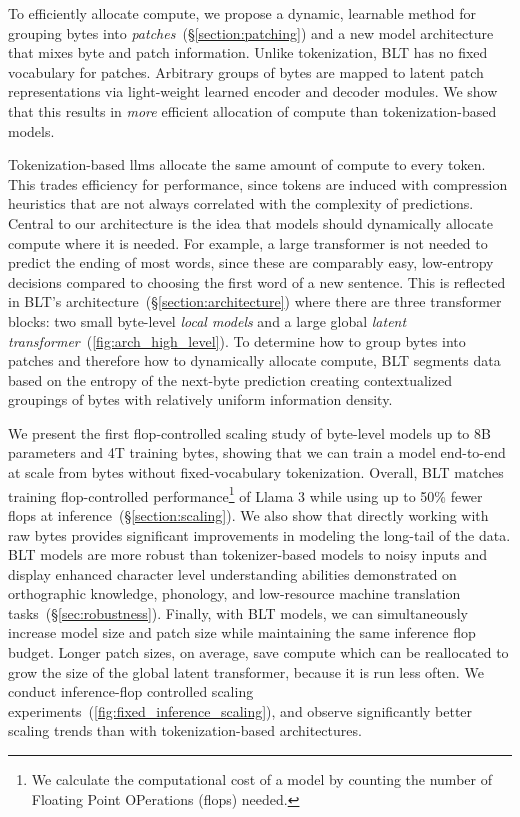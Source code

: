 To efficiently allocate compute, we propose a dynamic, learnable method for grouping bytes into \textit{patches}~(\S\ref{section:patching}) and a new model architecture that mixes byte and patch information. Unlike tokenization, {\textsc BLT} has no fixed vocabulary for patches. Arbitrary groups of bytes are mapped to latent patch representations via light-weight learned encoder and decoder modules. We show that this results in \textit{more} efficient allocation of compute than tokenization-based models.

Tokenization-based llms allocate the same amount of compute to every token. This trades efficiency for performance, since tokens are induced with compression heuristics that are not always correlated with the complexity of predictions. Central to our architecture is the idea that models should dynamically allocate compute where it is needed. For example, a large transformer is not needed to predict the ending of most words, since these are comparably easy, low-entropy decisions compared to choosing the first word of a new sentence. This is reflected in {\textsc BLT}'s architecture~(\S\ref{section:architecture}) where there are three transformer blocks: two small byte-level \textit{local models} and a large global \textit{latent transformer}~(\autoref{fig:arch_high_level}).
To determine how to group bytes into patches and therefore how to dynamically allocate compute, {\textsc BLT} segments data based on the entropy of the next-byte prediction creating contextualized groupings of bytes with relatively uniform information density.

We present the first flop-controlled scaling study of byte-level models up to 8B parameters and 4T training bytes, showing that we can train a model end-to-end at scale from bytes without fixed-vocabulary tokenization. Overall, {\textsc BLT} matches training flop-controlled performance\footnote{We calculate the computational cost of a model by counting the number of Floating Point OPerations (flops) needed.} of Llama 3 while using up to 50\% fewer flops at inference~(\S\ref{section:scaling}).
We also show that directly working with raw bytes provides significant improvements in modeling the long-tail of the data. {\textsc BLT} models are more robust than tokenizer-based models to noisy inputs and display enhanced character level understanding abilities demonstrated on orthographic knowledge, phonology, and low-resource machine translation tasks~(\S\ref{sec:robustness}).
Finally, with {\textsc BLT} models, we can simultaneously increase model size and patch size  while maintaining the same inference flop budget. Longer patch sizes, on average, save compute which can be reallocated to grow the size of the global latent transformer, because it is run less often. We conduct inference-flop controlled scaling experiments~(\autoref{fig:fixed_inference_scaling}), and observe significantly better scaling trends than with tokenization-based architectures. 

